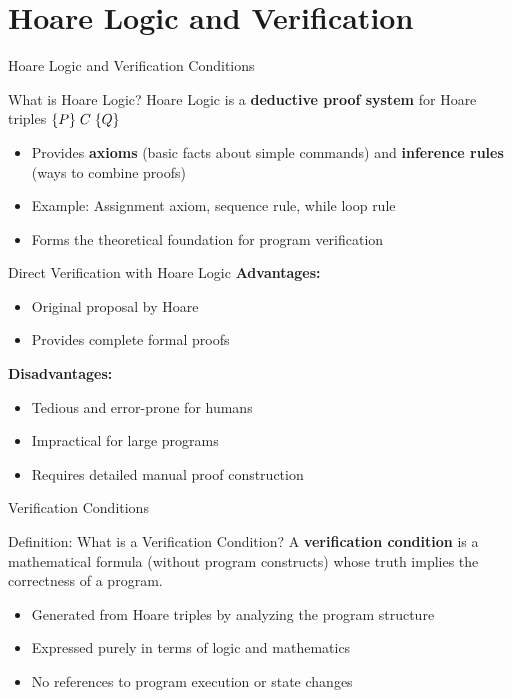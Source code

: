 \section{Hoare Logic and Verification}

\begin{frame}{Hoare Logic and Verification Conditions}
    \begin{block}{What is Hoare Logic?}
        Hoare Logic is a \textbf{deductive proof system} for Hoare triples $\{P\}\; C\; \{Q\}$
        \begin{itemize}
            \item Provides \textbf{axioms} (basic facts about simple commands) and \textbf{inference rules} (ways to combine proofs)
            \item Example: Assignment axiom, sequence rule, while loop rule
            \item Forms the theoretical foundation for program verification
        \end{itemize}
    \end{block}
    
    \begin{block}{Direct Verification with Hoare Logic}
        \textbf{Advantages:}
        \begin{itemize}
            \item Original proposal by Hoare
            \item Provides complete formal proofs
        \end{itemize}
        
        \textbf{Disadvantages:}
        \begin{itemize}
            \item Tedious and error-prone for humans
            \item Impractical for large programs
            \item Requires detailed manual proof construction
        \end{itemize}
    \end{block}
\end{frame}

\begin{frame}{Verification Conditions}
    \begin{block}{Definition: What is a Verification Condition?}
        A \textbf{verification condition} is a mathematical formula (without program constructs) whose truth implies the correctness of a program.
        \begin{itemize}
            \item Generated from Hoare triples by analyzing the program structure
            \item Expressed purely in terms of logic and mathematics
            \item No references to program execution or state changes
        \end{itemize}
    \end{block}
\end{frame}

